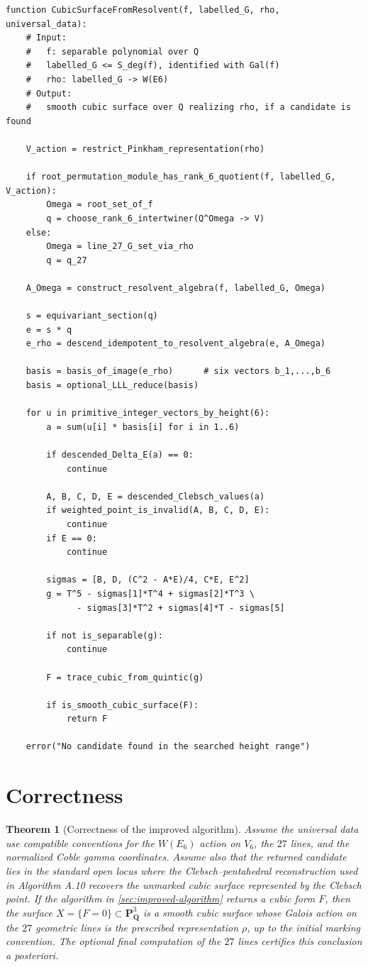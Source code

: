\documentclass[11pt]{article}
\newcommand{\QQ}{\mathbf{Q}}
\newcommand{\PP}{\mathbf{P}}
\newcommand{\V}{V_6}
\newtheorem{theorem}[definition]{Theorem}
\begin{document}
\begin{lstlisting}
function CubicSurfaceFromResolvent(f, labelled_G, rho, universal_data):
    # Input:
    #   f: separable polynomial over Q
    #   labelled_G <= S_deg(f), identified with Gal(f)
    #   rho: labelled_G -> W(E6)
    # Output:
    #   smooth cubic surface over Q realizing rho, if a candidate is found

    V_action = restrict_Pinkham_representation(rho)

    if root_permutation_module_has_rank_6_quotient(f, labelled_G, V_action):
        Omega = root_set_of_f
        q = choose_rank_6_intertwiner(Q^Omega -> V)
    else:
        Omega = line_27_G_set_via_rho
        q = q_27

    A_Omega = construct_resolvent_algebra(f, labelled_G, Omega)

    s = equivariant_section(q)
    e = s * q
    e_rho = descend_idempotent_to_resolvent_algebra(e, A_Omega)

    basis = basis_of_image(e_rho)      # six vectors b_1,...,b_6
    basis = optional_LLL_reduce(basis)

    for u in primitive_integer_vectors_by_height(6):
        a = sum(u[i] * basis[i] for i in 1..6)

        if descended_Delta_E(a) == 0:
            continue

        A, B, C, D, E = descended_Clebsch_values(a)
        if weighted_point_is_invalid(A, B, C, D, E):
            continue
        if E == 0:
            continue

        sigmas = [B, D, (C^2 - A*E)/4, C*E, E^2]
        g = T^5 - sigmas[1]*T^4 + sigmas[2]*T^3 \
              - sigmas[3]*T^2 + sigmas[4]*T - sigmas[5]

        if not is_separable(g):
            continue

        F = trace_cubic_from_quintic(g)

        if is_smooth_cubic_surface(F):
            return F

    error("No candidate found in the searched height range")
\end{lstlisting}

\section{Correctness}

\begin{theorem}[Correctness of the improved algorithm]
Assume the universal data use compatible conventions for the $W(E_6)$ action on
$\V$, the $27$ lines, and the normalized Coble gamma coordinates.  Assume also
that the returned candidate lies in the standard open locus where the
Clebsch--pentahedral reconstruction used in Algorithm A.10 recovers the unmarked
cubic surface represented by the Clebsch point.  If the algorithm in
\cref{sec:improved-algorithm} returns a cubic form $F$, then the surface
$X=\{F=0\}\subset\PP^3_\QQ$ is a smooth cubic surface whose Galois action on the
$27$ geometric lines is the prescribed representation $\rho$, up to the initial
marking convention.  The optional final computation of the $27$ lines certifies
this conclusion a posteriori.
\end{theorem}
\end{document}
